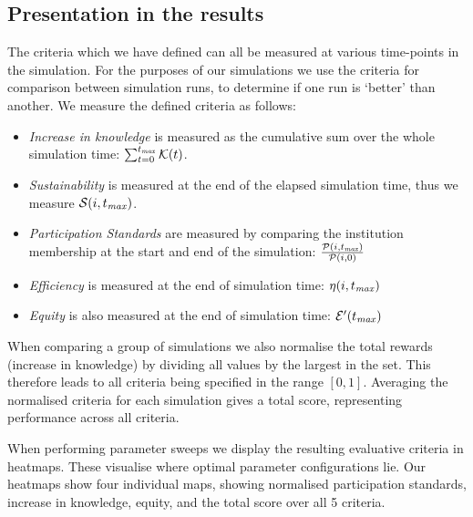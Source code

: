 \subsection{Presentation in the results}\label{sec:criteriapres}

The criteria which we have defined can all be measured at various time-points
in the simulation. For the purposes of our simulations we use the criteria for comparison between simulation runs, to determine if one run is `better' than another. We measure the defined criteria as follows:

\begin{itemize}
\item \emph{Increase in knowledge} is measured as the cumulative sum over the whole simulation time: $\sum_{t=0}^{t_{\mathit{max}}} \mathcal{K}(t)$.
\item \emph{Sustainability} is measured at the end of the elapsed simulation time, thus we measure $\mathcal{S}(i,t_{\mathit{max}})$.
\item \emph{Participation Standards} are measured by comparing the institution membership at the start and end of the simulation: $\frac{\mathcal{P}(i,t_{\mathit{max}})}{\mathcal{P}(i,0)}$
\item \emph{Efficiency} is measured at the end of simulation time: $\eta(i, t_{\mathit{max}})$
\item \emph{Equity} is also measured at the end of simulation time: $\mathcal{E}^\prime(t_{\mathit{max}})$
\end{itemize}

When comparing a group of simulations we also normalise the total rewards
(increase in knowledge) by dividing all values by the largest in the set. This
therefore leads to all criteria being specified in the range $[0,1]$.
Averaging the normalised criteria for each simulation gives a total score,
representing performance across all criteria.

When performing parameter sweeps we display the resulting evaluative criteria
in heatmaps. These visualise where optimal parameter configurations lie. Our
heatmaps show four individual maps, showing normalised participation
standards, increase in knowledge, equity, and the total score over all 5
criteria. 


